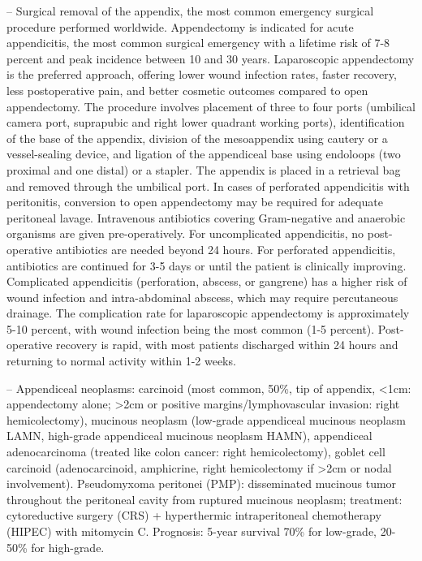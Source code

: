 -- Surgical removal of the appendix, the most common emergency surgical procedure performed worldwide. Appendectomy is indicated for acute appendicitis, the most common surgical emergency with a lifetime risk of 7-8 percent and peak incidence between 10 and 30 years. Laparoscopic appendectomy is the preferred approach, offering lower wound infection rates, faster recovery, less postoperative pain, and better cosmetic outcomes compared to open appendectomy. The procedure involves placement of three to four ports (umbilical camera port, suprapubic and right lower quadrant working ports), identification of the base of the appendix, division of the mesoappendix using cautery or a vessel-sealing device, and ligation of the appendiceal base using endoloops (two proximal and one distal) or a stapler. The appendix is placed in a retrieval bag and removed through the umbilical port. In cases of perforated appendicitis with peritonitis, conversion to open appendectomy may be required for adequate peritoneal lavage. Intravenous antibiotics covering Gram-negative and anaerobic organisms are given pre-operatively. For uncomplicated appendicitis, no post-operative antibiotics are needed beyond 24 hours. For perforated appendicitis, antibiotics are continued for 3-5 days or until the patient is clinically improving. Complicated appendicitis (perforation, abscess, or gangrene) has a higher risk of wound infection and intra-abdominal abscess, which may require percutaneous drainage. The complication rate for laparoscopic appendectomy is approximately 5-10 percent, with wound infection being the most common (1-5 percent). Post-operative recovery is rapid, with most patients discharged within 24 hours and returning to normal activity within 1-2 weeks.

-- Appendiceal neoplasms: carcinoid (most common, 50\%, tip of appendix, <1cm: appendectomy alone; >2cm or positive margins/lymphovascular invasion: right hemicolectomy), mucinous neoplasm (low-grade appendiceal mucinous neoplasm LAMN, high-grade appendiceal mucinous neoplasm HAMN), appendiceal adenocarcinoma (treated like colon cancer: right hemicolectomy), goblet cell carcinoid (adenocarcinoid, amphicrine, right hemicolectomy if >2cm or nodal involvement). Pseudomyxoma peritonei (PMP): disseminated mucinous tumor throughout the peritoneal cavity from ruptured mucinous neoplasm; treatment: cytoreductive surgery (CRS) + hyperthermic intraperitoneal chemotherapy (HIPEC) with mitomycin C. Prognosis: 5-year survival 70\% for low-grade, 20-50\% for high-grade.

